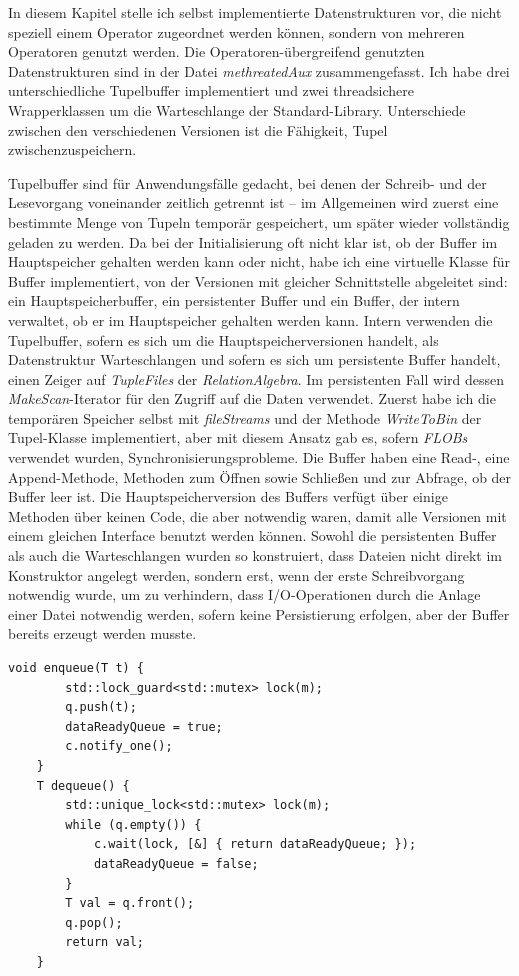 \documentclass[a4paper,12pt,twoside]{article}
\newcommand{\Fb}[1]{\textit{#1}} %
\begin{document}
In diesem Kapitel stelle ich selbst implementierte Datenstrukturen vor, die nicht speziell einem Operator zugeordnet werden können, sondern von mehreren Operatoren genutzt werden. Die Operatoren-übergreifend genutzten Datenstrukturen sind in der Datei \Fb{methreatedAux} zusammengefasst. Ich habe drei unterschiedliche Tupelbuffer implementiert und zwei threadsichere Wrapperklassen um die Warteschlange der Standard-Library. Unterschiede zwischen den verschiedenen Versionen ist die Fähigkeit, Tupel zwischenzuspeichern.

Tupelbuffer sind für Anwendungsfälle gedacht, bei denen der Schreib- und der Lesevorgang voneinander zeitlich getrennt ist -- im Allgemeinen wird zuerst eine bestimmte Menge von Tupeln temporär gespeichert, um später wieder vollständig geladen zu werden. Da bei der Initialisierung oft nicht klar ist, ob der Buffer im Hauptspeicher gehalten werden kann oder nicht, habe ich eine virtuelle Klasse für Buffer implementiert, von der Versionen mit gleicher Schnittstelle abgeleitet sind: ein Hauptspeicherbuffer, ein persistenter Buffer und ein Buffer, der intern verwaltet, ob er im Hauptspeicher gehalten werden kann. Intern verwenden die Tupelbuffer, sofern es sich um die Hauptspeicherversionen handelt, als Datenstruktur Warteschlangen und sofern es sich um persistente Buffer handelt, einen Zeiger auf \Fb{TupleFiles} der \Fb{RelationAlgebra}. Im persistenten Fall wird dessen \Fb{MakeScan}-Iterator für den Zugriff auf die Daten verwendet. Zuerst habe ich die temporären Speicher selbst mit \Fb{fileStreams} und der Methode \Fb{WriteToBin} der Tupel-Klasse implementiert, aber mit diesem Ansatz gab es, sofern \Fb{FLOBs} verwendet wurden, Synchronisierungsprobleme. Die Buffer haben eine Read-, eine Append-Methode, Methoden zum Öffnen sowie Schließen und zur Abfrage, ob der Buffer leer ist. Die Hauptspeicherversion des Buffers verfügt über einige Methoden über keinen Code, die aber notwendig waren, damit alle Versionen mit einem gleichen Interface benutzt werden können. Sowohl die persistenten Buffer als auch die Warteschlangen wurden so konstruiert, dass Dateien nicht direkt im Konstruktor angelegt werden, sondern erst, wenn der erste Schreibvorgang notwendig wurde, um zu verhindern, dass I/O-Operationen durch die Anlage einer Datei notwendig werden, sofern keine Persistierung erfolgen, aber der Buffer bereits erzeugt werden musste.

\begin{minipage}{0.95\textwidth}
	\begin{lstlisting}[caption={Enqueue und Dequeue-Methode der threadsichere Warteschlange.}, label=list:queue]
	void enqueue(T t) {
		std::lock_guard<std::mutex> lock(m);
		q.push(t);
		dataReadyQueue = true;
		c.notify_one();
	}
	T dequeue() {
		std::unique_lock<std::mutex> lock(m);
		while (q.empty()) {
			c.wait(lock, [&] { return dataReadyQueue; });
			dataReadyQueue = false;
		}
		T val = q.front();
		q.pop();
		return val;
	}
	\end{lstlisting}
\end{minipage}
\end{document}
